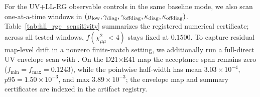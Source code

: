 \documentclass[aps,prd,onecolumn,notitlepage,nofootinbib,superscriptaddress,11pt,floatfix]{revtex4-2}
\begin{document}
\begin{table}[t]
\centering
\caption{Release-mode full direct map summary; exact source artifacts are listed in the reproducibility registry.}
\label{tab:full_direct_release}
\scriptsize
\setlength{\tabcolsep}{3pt}
\end{table}

For the UV+LL-RG observable controls in the same baseline mode, we also scan one-at-a-time windows in $(\mu_{\rm low},\gamma_{\rm diag},\gamma_{\rm offdiag},\kappa_{\rm diag},\kappa_{\rm offdiag})$. Table~\ref{tab:hll_rge_sensitivity} summarizes the registered numerical certificate; across all tested windows, $f(\chi^2_{\mu\mu}<4)$ stays fixed at $0.1500$.
To capture residual map-level drift in a nonzero finite-match setting, we additionally run a full-direct UV envelope scan with . On the D21$\times$E41 map the acceptance span remains zero ($f_{\min}=f_{\max}=0.1243$), while the pointwise half-width has mean $3.03\times10^{-4}$, $p95=1.50\times10^{-3}$, and max $3.89\times10^{-3}$; the envelope map and summary certificates are indexed in the artifact registry.
\end{document}
